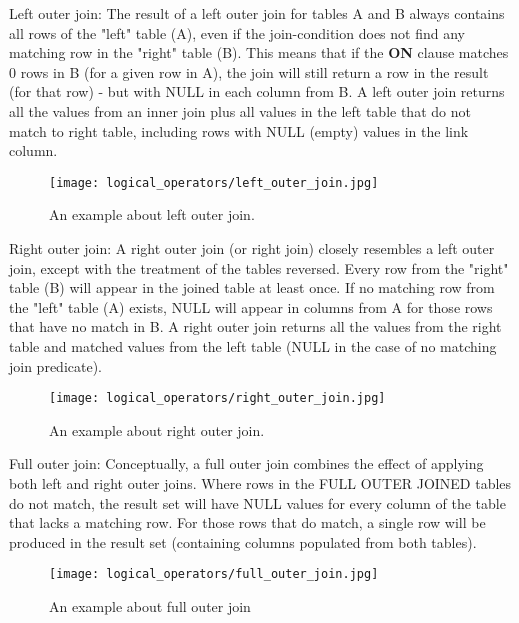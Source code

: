 {\justify
\begin{itemize}
{
\item Left outer join: The result  of a left outer join for tables A and B always contains all rows of the "left" table (A), even if the join-condition does not find any matching row in the "right" table (B). This means that if the {\bfseries ON} clause matches 0 rows in B (for a given row in A), the join will still return a row in the result (for that row) - but with NULL in each column from B. A left outer join returns all the values from an inner join plus all values in the left table that do not match to right table, including rows with NULL (empty) values in the link column.
\par }
{
\begin{figure}[H]
\centering
\texttt{[image: logical\_operators/left\_outer\_join.jpg]}
\caption{An example about left outer join.}
\end{figure}
}
\vspace{0.5cm}
{
\item Right outer join: A right outer join (or right join) closely resembles a left outer join, except with the treatment of the tables reversed. Every row from the "right" table (B) will appear in the joined table at least once. If no matching row from the "left" table (A) exists, NULL will appear in columns from A for those rows that have no match in B. A right outer join returns all the values from the right table and matched values from the left table (NULL in the case of no matching join predicate).
\par }
{
\begin{figure}[H]
\centering
\texttt{[image: logical\_operators/right\_outer\_join.jpg]}
\caption{An example about right outer join.}
\end{figure}
 }
\vspace{0.5cm}
{\justify
\item Full outer join: Conceptually, a full outer join combines the effect of applying both left and right outer joins. Where rows in the FULL OUTER JOINED tables do not match, the result set will have NULL values for every column of the table that lacks a matching row. For those rows that do match, a single row will be produced in the result set (containing columns populated from both tables).
\par }
{
\begin{figure}[H]
\centering
\texttt{[image: logical\_operators/full\_outer\_join.jpg]}
\caption{An example about full outer join}
\end{figure}
 }
\vspace{0.5cm}
\end{itemize}
\par }
\vspace{0.5cm}
